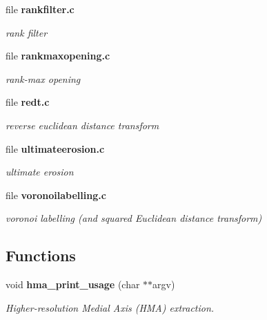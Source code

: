 \begin{DoxyCompactItemize}
\item 
file {\bf rankfilter.c}


\begin{DoxyCompactList}\small\item\em rank filter \item\end{DoxyCompactList}

\item 
file {\bf rankmaxopening.c}


\begin{DoxyCompactList}\small\item\em rank-\/max opening \item\end{DoxyCompactList}

\item 
file {\bf redt.c}


\begin{DoxyCompactList}\small\item\em reverse euclidean distance transform \item\end{DoxyCompactList}

\item 
file {\bf ultimateerosion.c}


\begin{DoxyCompactList}\small\item\em ultimate erosion \item\end{DoxyCompactList}

\item 
file {\bf voronoilabelling.c}


\begin{DoxyCompactList}\small\item\em voronoi labelling (and squared Euclidean distance transform) \item\end{DoxyCompactList}

\end{DoxyCompactItemize}
\subsection*{Functions}
\begin{DoxyCompactItemize}
\item 
void {\bf hma\_\-print\_\-usage} (char $\ast$$\ast$argv)
\begin{DoxyCompactList}\small\item\em Higher-\/resolution Medial Axis (HMA) extraction. \item\end{DoxyCompactList}\end{DoxyCompactItemize}


